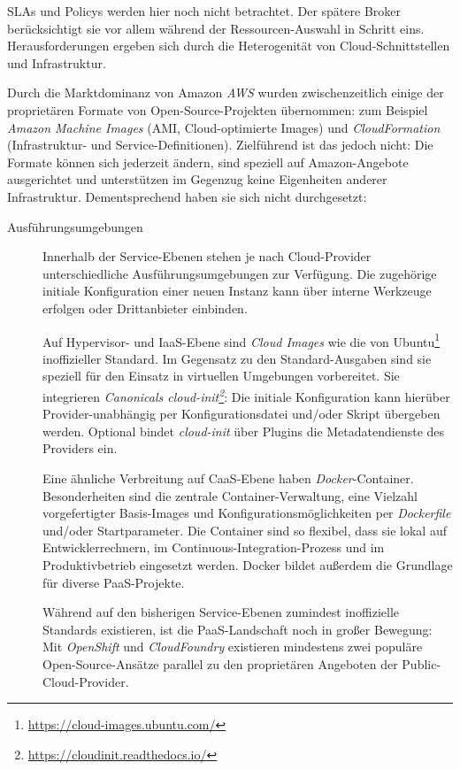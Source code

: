 \noindent
SLAs und Policys werden hier noch nicht betrachtet. Der spätere Broker berücksichtigt sie vor allem während der Ressourcen-Auswahl in Schritt eins. Herausforderungen ergeben sich durch die Heterogenität von Cloud-Schnittstellen und Infrastruktur.

Durch die Marktdominanz von Amazon \emph{AWS} wurden zwischenzeitlich einige der proprietären Formate von Open-Source-Projekten übernommen: zum Beispiel \emph{Amazon Machine Images} (AMI, Cloud-optimierte Images) und \emph{CloudFormation} (Infrastruktur- und Service-Definitionen). Zielführend ist das jedoch nicht: Die Formate können sich jederzeit ändern, sind speziell auf Amazon-Angebote ausgerichtet und unterstützen im Gegenzug keine Eigenheiten anderer Infrastruktur. Dementsprechend haben sie sich nicht durchgesetzt:

\begin{description}
	
	\item[Ausführungsumgebungen] Innerhalb der Service-Ebenen stehen je nach Cloud-Provider unterschiedliche Ausführungsumgebungen zur Verfügung. Die zugehörige initiale Konfiguration einer neuen Instanz kann über interne Werkzeuge erfolgen oder Drittanbieter einbinden.
	
	Auf Hypervisor- und IaaS-Ebene sind \emph{Cloud Images} wie die von Ubuntu\footnote{\url{https://cloud-images.ubuntu.com/}} inoffizieller Standard. Im Gegensatz zu den Standard-Ausgaben sind sie speziell für den Einsatz in virtuellen Umgebungen vorbereitet. Sie integrieren \emph{Canonicals cloud-init\footnote{\url{https://cloudinit.readthedocs.io/}}}: Die initiale Konfiguration kann hierüber Provider-unabhängig per Konfigurationsdatei und/oder Skript übergeben werden. Optional bindet \emph{cloud-init} über Plugins die Metadatendienste des Providers ein.
	
	Eine ähnliche Verbreitung auf CaaS-Ebene haben \emph{Docker}-Container. Besonderheiten sind die zentrale Container-Verwaltung, eine Vielzahl vorgefertigter Basis-Images und Konfigurationsmöglichkeiten per \emph{Dockerfile} und/oder Startparameter. Die Container sind so flexibel, dass sie lokal auf Entwicklerrechnern, im Continuous-Integration-Prozess und im Produktivbetrieb eingesetzt werden. Docker bildet außerdem die Grundlage für diverse PaaS-Projekte.
	
	Während auf den bisherigen Service-Ebenen zumindest inoffizielle Standards existieren, ist die PaaS-Landschaft noch in großer Bewegung: Mit \emph{Open\-Shift} und \emph{Cloud\-Foundry} existieren mindestens zwei populäre Open-Source-Ansätze parallel zu den proprietären Angeboten der Public-Cloud-Provider.
	

\end{description}
